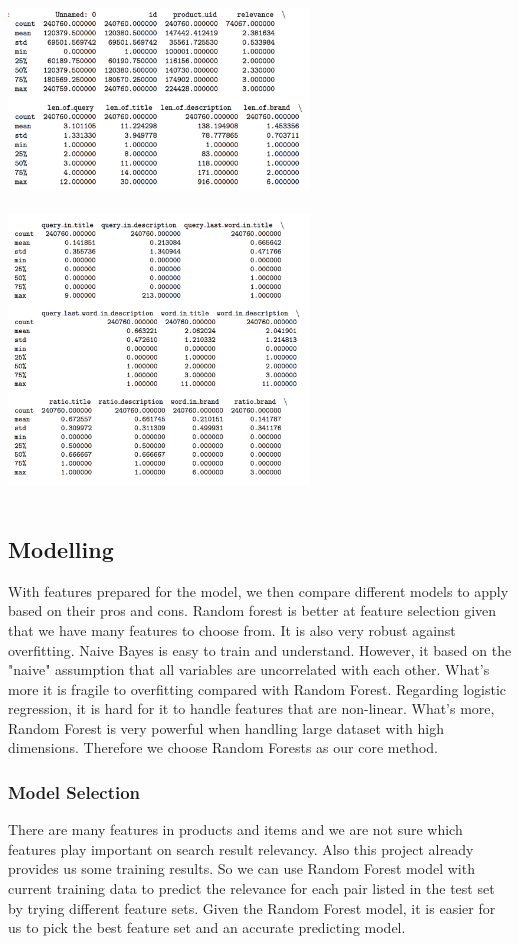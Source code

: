 \documentclass{sig-alternate-05-2015}
\begin{document}
\includegraphics[width=8cm, height=5cm]{scr-id.png}\\
\includegraphics[width=8cm, height=8cm]{scr-query.png}

\subsection{Modelling}
With features prepared for the model, we then compare different models to apply based on their pros and cons. Random forest is better at feature selection given that we have many features to choose from.\cite{rf0} It is also very robust against overfitting.\cite{rfwiki, rf1} Naive Bayes is easy to train and understand. However, it based on the "naive" assumption that all variables are uncorrelated with each other. What's more it is fragile to overfitting compared with Random Forest. Regarding logistic regression, it is hard for it to handle features that are non-linear. What's more, Random Forest is very powerful when handling large dataset with high dimensions.\cite{rf2, rf3} Therefore we choose Random Forests as our core method.

\subsubsection{Model Selection}
There are many features in products and items and we are not sure which features play important on search result relevancy. Also this project already provides us some training results. So we can use Random Forest model with current training data to predict the relevance for each pair listed in the test set by trying different feature sets. Given the Random Forest model, it is easier for us to pick the best feature set and an accurate predicting model.
\end{document}
